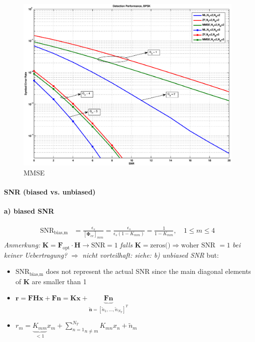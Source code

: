 \documentclass[a4paper, 10pt]{article}
\begin{document}
	\begin{figure}[h]
		\centering
		\includegraphics[width = \textwidth]{MMSE}
		\caption{MMSE}
		\label{fig:MMSE}
	\end{figure}
	
\paragraph{SNR (biased vs. unbiased)}
\paragraph{a) biased SNR}
\begin{align*}
	\text{SNR}_{\text{bias,m}} &= \frac{\epsilon_s}{[\boldsymbol{\Phi}_{ee}]_{mm}} = \frac{\epsilon_s}{\epsilon_s(1 - K_{mm})} = \frac{1}{1 - K_{mm}}, \quad 1\leq m \leq 4 
\end{align*}
	\textit{Anmerkung: } $\mathbf{K} = \mathbf{F}_{\text{opt}}\cdot\mathbf{H} \rightarrow \text{SNR} = 1 $ \textit{falls } $ \mathbf{K} = \text{zeros()} \Rightarrow \text{woher SNR } = 1 $ \textit{ bei keiner Uebertragung?} $\Rightarrow $ \textit{ nicht vorteilhaft: siehe: b) unbiased SNR}  %
but: 
\begin{itemize}
	\item $\text{SNR}_{\text{bias,m}} $ does not represent the actual SNR since the main diagonal elements of $ \mathbf{K} $ are smaller than 1
	\item $ \mathbf{r} = \mathbf{FHx} + \mathbf{Fn} = \mathbf{Kx} + \underbrace{\mathbf{F}\mathbf{n} }_{\mathbf{\tilde{n}} = [\tilde{n}_1, \dots,\tilde{n}_{N_T}]^T } $
	\item $r_m = \underbrace{K_{mm}}_{<1}x_m + \underset{ n\neq m}{\sum\limits^{N_T}_{n = 1}}K_{mn}x_n + \tilde{n}_m $
\end{itemize}
\end{document}
